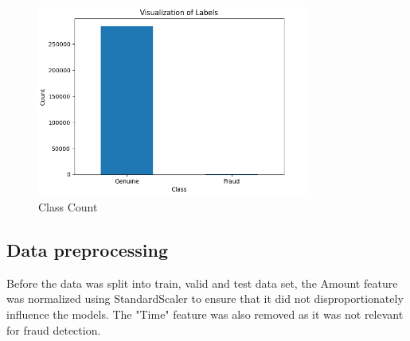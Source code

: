 \documentclass[11pt]{article}
\begin{document}
\begin{figure}[H]
	\centering
	\includegraphics[width=0.8\textwidth]{figure/Count_Class.png}
	\caption{Class Count}
	\label{fig:Class Count}
\end{figure}

\subsection{Data preprocessing}



Before the data was split into train, valid and test data set, the Amount feature was normalized using StandardScaler to ensure that it did not disproportionately influence the models. The "Time" feature was also removed as it was not relevant for fraud detection.
\end{document}
